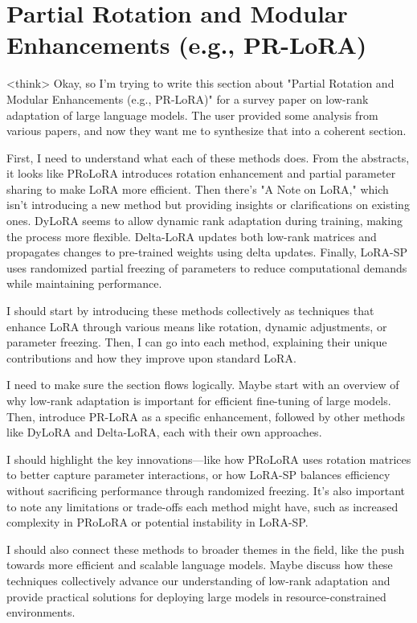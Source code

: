 \documentclass[conference]{IEEEtran}
\begin{document}
\section{Partial Rotation and Modular Enhancements (e.g., PR-LoRA)}
<think>
Okay, so I'm trying to write this section about "Partial Rotation and Modular Enhancements (e.g., PR-LoRA)" for a survey paper on low-rank adaptation of large language models. The user provided some analysis from various papers, and now they want me to synthesize that into a coherent section.

First, I need to understand what each of these methods does. From the abstracts, it looks like PRoLoRA introduces rotation enhancement and partial parameter sharing to make LoRA more efficient. Then there's "A Note on LoRA," which isn't introducing a new method but providing insights or clarifications on existing ones. DyLoRA seems to allow dynamic rank adaptation during training, making the process more flexible. Delta-LoRA updates both low-rank matrices and propagates changes to pre-trained weights using delta updates. Finally, LoRA-SP uses randomized partial freezing of parameters to reduce computational demands while maintaining performance.

I should start by introducing these methods collectively as techniques that enhance LoRA through various means like rotation, dynamic adjustments, or parameter freezing. Then, I can go into each method, explaining their unique contributions and how they improve upon standard LoRA.

I need to make sure the section flows logically. Maybe start with an overview of why low-rank adaptation is important for efficient fine-tuning of large models. Then, introduce PR-LoRA as a specific enhancement, followed by other methods like DyLoRA and Delta-LoRA, each with their own approaches.

I should highlight the key innovations—like how PRoLoRA uses rotation matrices to better capture parameter interactions, or how LoRA-SP balances efficiency without sacrificing performance through randomized freezing. It's also important to note any limitations or trade-offs each method might have, such as increased complexity in PRoLoRA or potential instability in LoRA-SP.

I should also connect these methods to broader themes in the field, like the push towards more efficient and scalable language models. Maybe discuss how these techniques collectively advance our understanding of low-rank adaptation and provide practical solutions for deploying large models in resource-constrained environments.
\end{document}
